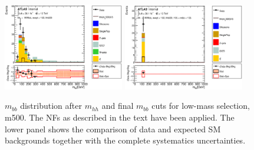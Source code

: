 \begin{figure}[!h]
\begin{center}
\includegraphics*[width=0.47\textwidth] {figures/Unblinded_mbb/C_reOpt500_mww_bbpt210_wwpt150_hh500_bbMass_regionA_met25d020.eps}
\includegraphics*[width=0.47\textwidth] {figures/Unblinded_mbb/C_reOpt500_mww_bbpt210_wwpt150_hh500_mbb_bbMass_regionA_met25d020.eps}
\caption[$m_{bb}$ distribution after $m_{hh}$ and final $m_{bb}$ cuts for low-mass selection, m500.]{$m_{bb}$ distribution after $m_{hh}$ and final $m_{bb}$ cuts for low-mass selection, m500. The NFs as described in the text have been applied. The lower panel shows the comparison of data and expected SM backgrounds together with the complete systematics uncertainties.}
\end{center}
\end{figure}

